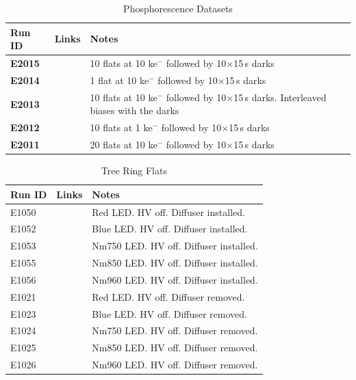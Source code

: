 \begin{table}[H]\label{table:runs_phosphorescence}
\centering
\caption{Phosphorescence Datasets}
\begin{tabular}{|p{1.5cm}|p{2.9cm}|p{9cm}|}
\hline
Run ID & Links & Notes \\ \hline
\textbf{E2015} & & 10 flats at 10 ke$^-$ followed by 10$\times$15\,s darks \\ \hline
\textbf{E2014} & & 1 flat at 10 ke$^-$ followed by 10$\times$15\,s darks \\ \hline
\textbf{E2013} & & 10 flats at 10 ke$^-$ followed by 10$\times$15\,s darks. Interleaved biases with the darks \\ \hline
\textbf{E2012} & & 10 flats at 1 ke$^-$ followed by 10$\times$15\,s darks \\ \hline
\textbf{E2011} & & 20 flats at 10 ke$^-$ followed by 10$\times$15\,s darks \\ \hline
\end{tabular}
\end{table}

\begin{table}[H]\label{table:runs_treeRing}
\centering
\caption{Tree Ring Flats}
\begin{tabular}{|p{1.5cm}|p{2.9cm}|p{9cm}|}
\hline
Run ID & Links & Notes \\ \hline
E1050 & & Red LED. HV off. Diffuser installed. \\ \hline
E1052 & & Blue LED. HV off. Diffuser installed. \\ \hline
E1053 & & Nm750 LED. HV off. Diffuser installed. \\ \hline
E1055 & & Nm850 LED. HV off. Diffuser installed. \\ \hline
E1056 & & Nm960 LED. HV off. Diffuser installed. \\ \hline
\hline
E1021 & & Red LED. HV off. Diffuser removed. \\ \hline
E1023 & & Blue LED. HV off. Diffuser removed. \\ \hline
E1024 & & Nm750 LED. HV off. Diffuser removed. \\ \hline
E1025 & & Nm850 LED. HV off. Diffuser removed. \\ \hline
E1026 & & Nm960 LED. HV off. Diffuser removed. \\ \hline
\end{tabular}
\end{table}

